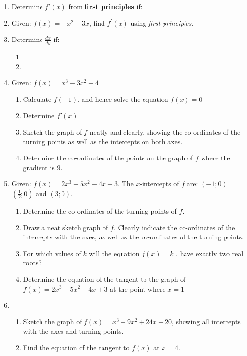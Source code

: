 \begin{enumerate}

\item{Determine $f'(x)$ from \textbf{first principles} if:
\begin{enumerate}
\end{enumerate}}

\item{Given: \quad $f(x) = -x^2 + 3x$, find $f^{\prime}(x)$ using \textit{first principles}.}

\item{Determine $\frac{dx}{dy}$ if:
\begin{enumerate}
\item{}
\item{}
\end{enumerate}}

\item{Given: $f(x) =x^3 - 3x^2 + 4$
\begin{enumerate}
\item{Calculate $f(-1)$, and hence solve the equation $f(x)=0$}
\item{Determine $f'(x)$}
\item{Sketch the graph of $f$ neatly and clearly, showing the co-ordinates of the turning points as well as the intercepts on both axes.}
\item{Determine the co-ordinates of the points on the graph of $f$  where the gradient is $9$.}
\end{enumerate}}

\item{Given: $f(x) = 2x^3 - 5x^2 - 4x + 3$.
The $x$-intercepts of $f$ are: $(-1;0)$ $(\frac{1}{2};0)$ and $(3;0)$.
\begin{enumerate}
\item{Determine the co-ordinates of the turning points of $f$.}
\item{Draw a neat sketch graph of $f$. Clearly indicate the co-ordinates of the intercepts with the axes, as well as the co-ordinates of the turning points.}
\item{For which values of $k$ will the equation $f(x) = k$ , have exactly two real roots?}
\item{Determine the equation of the tangent to the graph of
$f(x) = 2x^3 - 5x^2 - 4x + 3$ at the point where $x = 1$.}
\end{enumerate}}

\item{\begin{enumerate}
\item{Sketch the graph of $f(x) = x^3 - 9x^2 + 24x - 20$, showing all intercepts with the axes and turning points.}
\item{Find the equation of the tangent to $f(x)$ at $x=4$.}
\end{enumerate}}


\end{enumerate}
